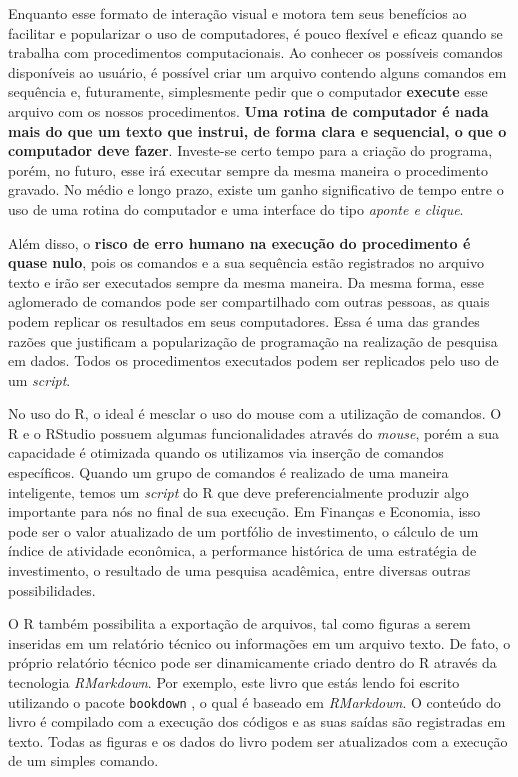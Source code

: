 \documentclass[
  11pt,
]{book}
\begin{document}
Enquanto esse formato de interação visual e motora tem seus benefícios ao facilitar e popularizar o uso de computadores, é pouco flexível e eficaz quando se trabalha com procedimentos computacionais. Ao conhecer os possíveis comandos disponíveis ao usuário, é possível criar um arquivo contendo alguns comandos em sequência e, futuramente, simplesmente pedir que o computador \textbf{execute} esse arquivo com os nossos procedimentos. \textbf{Uma rotina de computador é nada mais do que um texto que instrui, de forma clara e sequencial, o que o computador deve fazer}. Investe-se certo tempo para a criação do programa, porém, no futuro, esse irá executar sempre da mesma maneira o procedimento gravado. No médio e longo prazo, existe um ganho significativo de tempo entre o uso de uma rotina do computador e uma interface do tipo \emph{aponte e clique}.

Além disso, o \textbf{risco de erro humano na execução do procedimento é quase nulo}, pois os comandos e a sua sequência estão registrados no arquivo texto e irão ser executados sempre da mesma maneira. Da mesma forma, esse aglomerado de comandos pode ser compartilhado com outras pessoas, as quais podem replicar os resultados em seus computadores. Essa é uma das grandes razões que justificam a popularização de programação na realização de pesquisa em dados. Todos os procedimentos executados podem ser replicados pelo uso de um \emph{script}.

No uso do R, o ideal é mesclar o uso do mouse com a utilização de comandos. O R e o RStudio possuem algumas funcionalidades através do \emph{mouse}, porém a sua capacidade é otimizada quando os utilizamos via inserção de comandos específicos. Quando um grupo de comandos é realizado de uma maneira inteligente, temos um \emph{script} do R que deve preferencialmente produzir algo importante para nós no final de sua execução. Em Finanças e Economia, isso pode ser o valor atualizado de um portfólio de investimento, o cálculo de um índice de atividade econômica, a performance histórica de uma estratégia de investimento, o resultado de uma pesquisa acadêmica, entre diversas outras possibilidades.

O R também possibilita a exportação de arquivos, tal como figuras a serem inseridas em um relatório técnico ou informações em um arquivo texto. De fato, o próprio relatório técnico pode ser dinamicamente criado dentro do R através da tecnologia \emph{RMarkdown}. Por exemplo, este livro que estás lendo foi escrito utilizando o pacote \texttt{bookdown} \citep{R-bookdown}, o qual é baseado em \emph{RMarkdown}. O conteúdo do livro é compilado com a execução dos códigos e as suas saídas são registradas em texto. Todas as figuras e os dados do livro podem ser atualizados com a execução de um simples comando.
\end{document}
